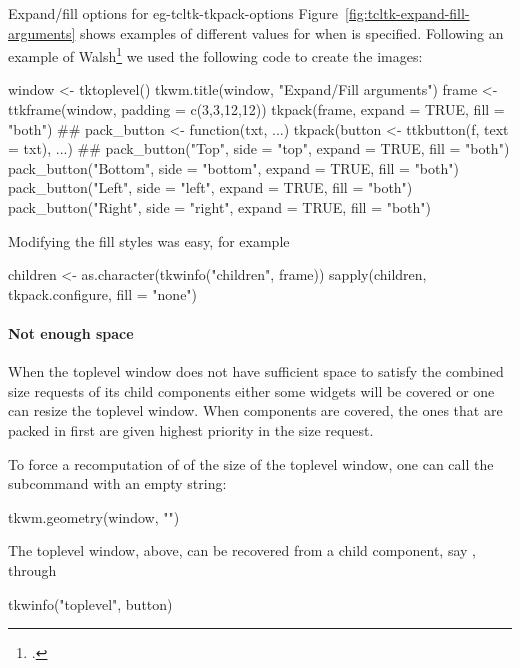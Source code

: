\begin{example}{Expand/fill options for }{eg-tcltk-tkpack-options}
Figure~\ref{fig:tcltk-expand-fill-arguments} shows examples of
different values for  when  is
specified. Following an example of Walsh\footcite{Walsh} we used the following code to create the
images:
\begin{Schunk}
\begin{Sinput}
 window <- tktoplevel()
 tkwm.title(window, "Expand/Fill arguments")
 frame <- ttkframe(window, padding = c(3,3,12,12))
 tkpack(frame, expand = TRUE, fill = "both")
 ##
 pack_button <- function(txt, ...) 
   tkpack(button <- ttkbutton(f, text = txt), ...)
 ##
 pack_button("Top",    side = "top",    expand = TRUE, fill = "both") 
 pack_button("Bottom", side = "bottom", expand = TRUE, fill = "both") 
 pack_button("Left",   side = "left",   expand = TRUE, fill = "both") 
 pack_button("Right",  side = "right",  expand = TRUE, fill = "both") 
\end{Sinput}
\end{Schunk}
%

Modifying the fill styles was easy, for example
\begin{Schunk}
\begin{Sinput}
 children <- as.character(tkwinfo("children", frame))
 sapply(children, tkpack.configure, fill = "none")
\end{Sinput}
\end{Schunk}
\end{example}



\paragraph{Not enough space}
When the toplevel window does not have sufficient space to satisfy the
combined size requests of its child components either some
widgets will be covered or one can resize the toplevel window.
When components are covered, the ones that are packed in first are given
highest priority in the size request.

To force a recomputation of of the size of the toplevel window, one can
call the  subcommand with an empty string:
\begin{Schunk}
\begin{Sinput}
 tkwm.geometry(window, "")
\end{Sinput}
\end{Schunk}
%
The toplevel window,  above, can be recovered from a child
component, say , through
\begin{Schunk}
\begin{Sinput}
 tkwinfo("toplevel", button)
\end{Sinput}
\end{Schunk}



